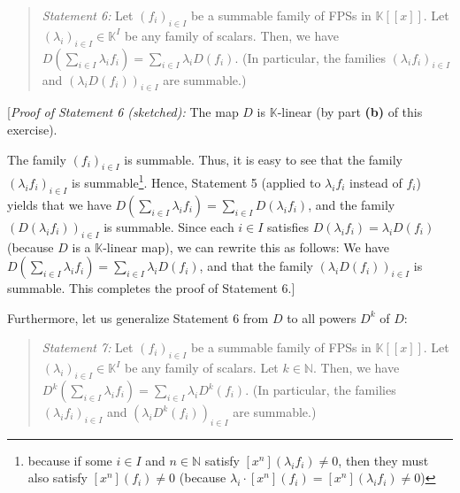 \documentclass[paper=a4, fontsize=12pt]{scrartcl}%
\let\sumnonlimits\sum
\renewcommand{\sum}{\sumnonlimits\limits}
\theoremstyle{plainsl}
\theoremstyle{definition}
\theoremstyle{remark}
\newenvironment{statement}{\begin{quote}}{\end{quote}}
\begin{document}
\begin{statement}
\textit{Statement 6:} Let $\left(  f_{i}\right)  _{i\in I}$ be a summable
family of FPSs in $\mathbb{K}\left[  \left[  x\right]  \right]  $. Let
$\left(  \lambda_{i}\right)  _{i\in I}\in\mathbb{K}^{I}$ be any family of
scalars. Then, we have $D\left(  \sum_{i\in I}\lambda_{i}f_{i}\right)
=\sum_{i\in I}\lambda_{i}D\left(  f_{i}\right)  $. (In particular, the
families $\left(  \lambda_{i}f_{i}\right)  _{i\in I}$ and $\left(  \lambda
_{i}D\left(  f_{i}\right)  \right)  _{i\in I}$ are summable.)
\end{statement}

[\textit{Proof of Statement 6 (sketched):} The map $D$ is $\mathbb{K}$-linear
(by part \textbf{(b)} of this exercise).

The family $\left(  f_{i}\right)  _{i\in I}$ is summable. Thus, it is easy to
see that the family $\left(  \lambda_{i}f_{i}\right)  _{i\in I}$ is
summable\footnote{because if some $i\in I$ and $n\in\mathbb{N}$ satisfy
$\left[  x^{n}\right]  \left(  \lambda_{i}f_{i}\right)  \neq0$, then they must
also satisfy $\left[  x^{n}\right]  \left(  f_{i}\right)  \neq0$ (because
$\lambda_{i}\cdot\left[  x^{n}\right]  \left(  f_{i}\right)  =\left[
x^{n}\right]  \left(  \lambda_{i}f_{i}\right)  \neq0$)}. Hence, Statement 5
(applied to $\lambda_{i}f_{i}$ instead of $f_{i}$) yields that we have
$D\left(  \sum_{i\in I}\lambda_{i}f_{i}\right)  =\sum_{i\in I}D\left(
\lambda_{i}f_{i}\right)  $, and the family $\left(  D\left(  \lambda_{i}%
f_{i}\right)  \right)  _{i\in I}$ is summable. Since each $i\in I$ satisfies
$D\left(  \lambda_{i}f_{i}\right)  =\lambda_{i}D\left(  f_{i}\right)  $
(because $D$ is a $\mathbb{K}$-linear map), we can rewrite this as follows: We
have $D\left(  \sum_{i\in I}\lambda_{i}f_{i}\right)  =\sum_{i\in I}\lambda
_{i}D\left(  f_{i}\right)  $, and that the family $\left(  \lambda_{i}D\left(
f_{i}\right)  \right)  _{i\in I}$ is summable. This completes the proof of
Statement 6.]

\bigskip

Furthermore, let us generalize Statement 6 from $D$ to all powers $D^{k}$ of
$D$:

\begin{statement}
\textit{Statement 7:} Let $\left(  f_{i}\right)  _{i\in I}$ be a summable
family of FPSs in $\mathbb{K}\left[  \left[  x\right]  \right]  $. Let
$\left(  \lambda_{i}\right)  _{i\in I}\in\mathbb{K}^{I}$ be any family of
scalars. Let $k\in\mathbb{N}$. Then, we have $D^{k}\left(  \sum_{i\in
I}\lambda_{i}f_{i}\right)  =\sum_{i\in I}\lambda_{i}D^{k}\left(  f_{i}\right)
$. (In particular, the families $\left(  \lambda_{i}f_{i}\right)  _{i\in I}$
and $\left(  \lambda_{i}D^{k}\left(  f_{i}\right)  \right)  _{i\in I}$ are summable.)
\end{statement}
\end{document}
